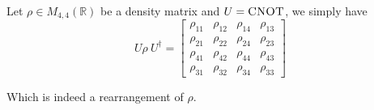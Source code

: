\documentclass[../main.tex]{subfiles}
\begin{document}
\bigskip
\begin{exercise}
\end{exercise}
Let $\rho\in M_{4,4}(\mathbb{R})$ be a density matrix and $U=\textsc{CNOT}$, we simply have
\[
    U\rho\ U^\dagger 
    = \begin{bmatrix}
    \rho_{11} & \rho_{12} & \rho_{14} & \rho_{13} \\
    \rho_{21} & \rho_{22} & \rho_{24} & \rho_{23} \\
    \rho_{41} & \rho_{42} & \rho_{44} & \rho_{43} \\
    \rho_{31} & \rho_{32} & \rho_{34} & \rho_{33}
    \end{bmatrix}
\]

Which is indeed a rearrangement of $\rho$.

\bigskip
\begin{exercise}
\end{exercise}
\end{document}
